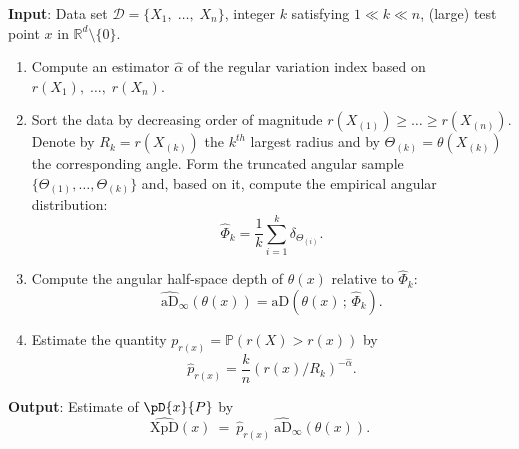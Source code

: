\documentclass{article}
\numberwithin{equation}{section}
\renewcommand{\P}{\mathbb{P}}
\newcommand{\rset}{\mathbb{R}}
\newcommand{\PP}{\P}%
\newcommand{\XpDsymbol}{\mathrm{XpD}}  %
\newcommand{\XpD}{\ensuremath{\XpDsymbol}}
\newcommand{\coD}[2]{\pD{#1}{#2}}
\newcommand{\aD}[2]{{\mathrm{aD}}\left({#1}\,;\,{#2}\right)}
\begin{document}
\begin{algorithm}[h!]\caption{$\XpD$: Polar Depth Extrapolation
in Tail Regions}\label{alg:depthEstimation-standard}
{\bf Input}: Data set $\mathcal{D}=\{X_1,\; \ldots,\; X_n\}$, integer
$k$ satisfying $1\ll k\ll n$, (large)
test point $x$ in $\rset^d\setminus\{0\}$. %
\begin{enumerate}
    \item Compute an estimator $\widehat \alpha$ of the regular
        variation index based on $r(X_1),\; \ldots,\; r(X_n)$.
    \item  Sort the data by decreasing order of magnitude
        $r(X_{(1)})\ge \dots \ge
        r(X_{(n)})$. Denote by
        $R_k = r(X_{(k)})$ the $k^{th}$ largest radius and by $\Theta_{(k)} =
        \theta(X_{(k)})$ the corresponding angle. Form the truncated
        angular sample $\{
        \Theta_{(1)}, \ldots, \Theta_{(k)}\}$ and, based on it,
        compute the empirical angular distribution:
        $$\widehat \Phi_k= \frac{1}{k}\sum_{i=1}^k
        \delta_{\Theta_{(i)}}.$$
    \item Compute the angular half-space depth of $\theta(x)$
        relative to $\widehat \Phi_k$:
        $$
       \widehat{\mathrm{aD}}_\infty(\theta(x)) = \aD{\theta(x)}{\widehat \Phi_k}.
        $$

    \item Estimate  the quantity $p_{r(x)} = \PP(r(X)>r(x))$ by
        \begin{equation}
            \widehat{p}_{r(x)} = \frac{k}{n}
            (r(x)/R_k)^{-\widehat \alpha}.
        \end{equation}

\end{enumerate}
{\bf Output}: Estimate of $\coD{x}{P}$ by
\begin{equation}
    \widehat{\mathrm{XpD}}(x) ~= ~
    \widehat{p}_{r(x)} ~\widehat{\mathrm{aD}}_\infty(\theta(x)).
\end{equation}

\end{algorithm}
\end{document}

